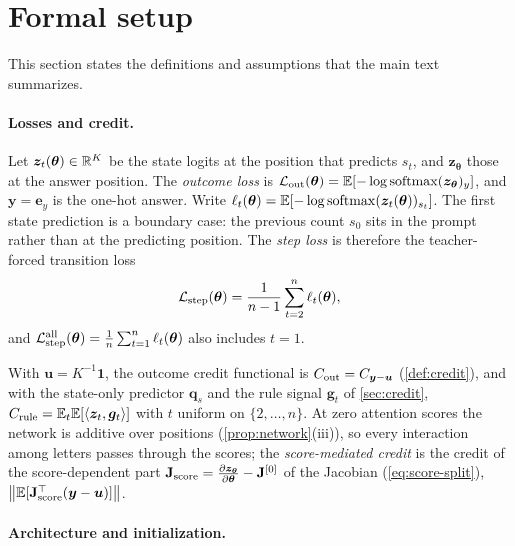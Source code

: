 \providecommand{\reg}[1]{\ensuremath{\mathsf{#1}}}

\section{Formal setup}
\label{app:formal}

This section states the definitions and assumptions that the main text summarizes.

\paragraph{Losses and credit.}

\begin{definition}
\label{def:losses}
Let $\bm z_t(\bm\theta)\in\mathbb R^K$ be the state logits at the position that predicts $s_t$, and $\bm z_{\bm\theta}$
those at the answer position. The \emph{outcome loss} is $\mathcal L_{\mathrm{out}}(\bm\theta)=\mathbb E[-\log\operatorname{softmax}(\bm z_{\bm\theta})_y]$, and $\bm y=\bm e_y$ is the one-hot answer.
Write $\ell_t(\bm\theta)=\mathbb E[-\log\operatorname{softmax}(\bm z_t(\bm\theta))_{s_t}]$. The first state prediction is a boundary case: the previous
count $s_0$ sits in the prompt rather than at the predicting position. The \emph{step loss} is therefore the teacher-forced
transition loss
\[
 \mathcal L_{\mathrm{step}}(\bm\theta)=\frac{1}{n-1}\sum_{t=2}^n\ell_t(\bm\theta),
\]
and $\Lstep^{\mathrm{all}}(\bm\theta)=\tfrac{1}{n}\sum_{t=1}^n\ell_t(\bm\theta)$ also includes $t=1$.
\end{definition}

With $\bm u=K^{-1}\bm 1$, the outcome credit functional is $C_{\mathrm{out}}=C_{\bm y-\bm u}$ (\cref{def:credit}), and with the state-only
predictor $\bm q_s$ and the rule signal $\bm g_t$ of \cref{sec:credit}, $C_{\mathrm{rule}}=\mathbb E_t\mathbb E[\langle\bm z_t,\bm g_t\rangle]$ with $t$ uniform on $\{2,\ldots,n\}$. At zero
attention scores the network is additive over positions (\cref{prop:network}(iii)), so every interaction among letters passes through the
scores; the \emph{score-mediated credit} is the credit of the score-dependent part $\mathbf J_{\mathrm{score}}=\Jz-\mathbf J^{[0]}$ of the Jacobian (\cref{eq:score-split}),
$\bigl\|\mathbb E[\mathbf J_{\mathrm{score}}^\top(\bm y-\bm u)]\bigr\|$.

\paragraph{Architecture and initialization.}

